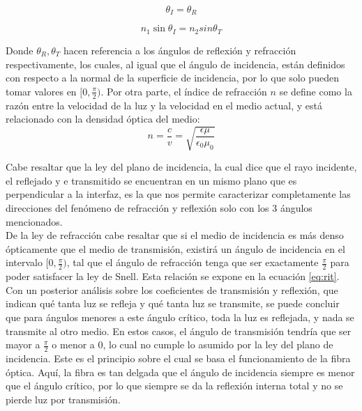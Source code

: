 \documentclass[%
 reprint,
 amsmath,amssymb,
 aps,
]{revtex4-1}
\begin{document}
\begin{equation}
	\theta_I = \theta_R
\label{eq:reflexion}
\end{equation}

\begin{equation}
	n_1\sin{\theta_I} = n_2sin{\theta_T}
\label{eq:refraccion}
\end{equation}

Donde $\theta_R, \theta_T$ hacen referencia a los ángulos de reflexión y refracción respectivamente, los cuales, al igual que el ángulo de incidencia, están definidos con respecto a la normal de la superficie de incidencia, por lo que solo pueden tomar valores en $[0,\frac{\pi}{2})$. Por otra parte, el índice de refracción $n$ se define como la razón entre la velocidad de la luz y la velocidad en el medio actual, y está relacionado con la densidad óptica del medio:\\

\begin{equation}
	n = \frac{c}{v} = \sqrt{\frac{\epsilon\mu}{\epsilon_0\mu_0}}
\label{eq:indice}
\end{equation}

Cabe resaltar que la ley del plano de incidencia, la cual dice que el rayo incidente, el reflejado y e transmitido se encuentran en un mismo plano que es perpendicular a la interfaz, es la que nos permite caracterizar completamente las direcciones del fenómeno de refracción y reflexión solo con los 3 ángulos mencionados.\\

De la ley de refracción cabe resaltar que si el medio de incidencia es más denso ópticamente que el medio de transmisión, existirá un ángulo de incidencia en el intervalo $[0,\frac{\pi}{2})$, tal que el ángulo de refracción tenga que ser exactamente $\frac{\pi}{2}$ para poder satisfacer la ley de Snell. Esta relación se expone en la ecuación \ref{eq:rit}. Con un posterior análisis sobre los coeficientes de transmisión y reflexión, que indican qué tanta luz se refleja y qué tanta luz se transmite, se puede concluir que para ángulos menores a este ángulo crítico, toda la luz es reflejada, y nada se transmite al otro medio. En estos casos, el ángulo de transmisión tendría que ser mayor a $\frac{\pi}{2}$ o menor a $0$, lo cual no cumple lo asumido por la ley del plano de incidencia. Este es el principio sobre el cual se basa el funcionamiento de la fibra óptica. Aquí, la fibra es tan delgada que el ángulo de incidencia siempre es menor que el ángulo crítico, por lo que siempre se da la reflexión interna total y no se pierde luz por transmisión.\\
\end{document}
